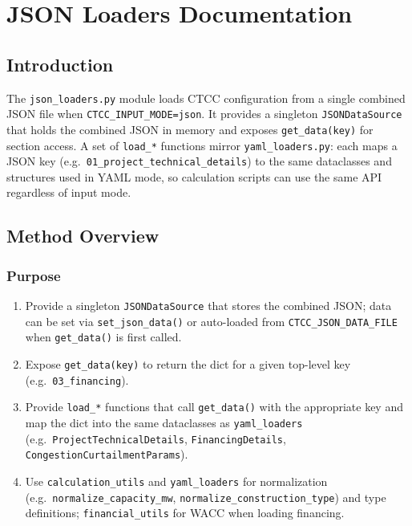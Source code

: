 \documentclass[ctcc_full_documentation.tex]{subfiles}
\begin{document}
\chapter{JSON Loaders Documentation}

\section{Introduction}

The \texttt{json\_loaders.py} module loads CTCC configuration from a single combined JSON file when \texttt{CTCC\_INPUT\_MODE=json}. It provides a singleton \texttt{JSONDataSource} that holds the combined JSON in memory and exposes \texttt{get\_data(key)} for section access. A set of \texttt{load\_*} functions mirror \texttt{yaml\_loaders.py}: each maps a JSON key (e.g.\ \texttt{01\_project\_technical\_details}) to the same dataclasses and structures used in YAML mode, so calculation scripts can use the same API regardless of input mode.

\section{Method Overview}

\subsection{Purpose}

\begin{enumerate}
    \item Provide a singleton \texttt{JSONDataSource} that stores the combined JSON; data can be set via \texttt{set\_json\_data()} or auto-loaded from \texttt{CTCC\_JSON\_DATA\_FILE} when \texttt{get\_data()} is first called.
    \item Expose \texttt{get\_data(key)} to return the dict for a given top-level key (e.g.\ \texttt{03\_financing}).
    \item Provide \texttt{load\_*} functions that call \texttt{get\_data()} with the appropriate key and map the dict into the same dataclasses as \texttt{yaml\_loaders} (e.g.\ \texttt{ProjectTechnicalDetails}, \texttt{FinancingDetails}, \texttt{CongestionCurtailmentParams}).
    \item Use \texttt{calculation\_utils} and \texttt{yaml\_loaders} for normalization (e.g.\ \texttt{normalize\_capacity\_mw}, \texttt{normalize\_construction\_type}) and type definitions; \texttt{financial\_utils} for WACC when loading financing.
\end{enumerate}
\end{document}
